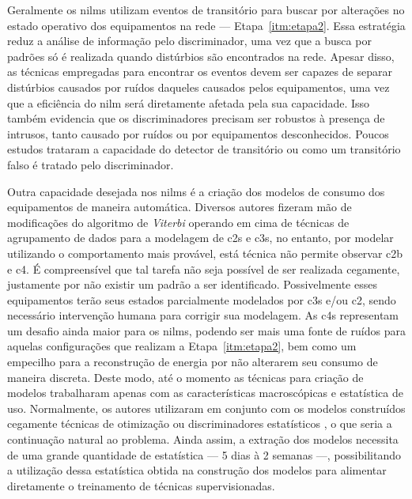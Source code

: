 Geralmente os \glspl{nilm} utilizam eventos de transitório para buscar
por alterações no estado operativo dos equipamentos na rede ---
Etapa~\ref{itm:etapa2}. Essa estratégia reduz a análise de informação
pelo discriminador, uma vez que a busca por padrões só é realizada
quando distúrbios são encontrados na rede. Apesar disso, as técnicas
empregadas para encontrar os eventos devem ser capazes de separar
distúrbios causados por ruídos daqueles causados pelos equipamentos, uma
vez que a eficiência do \gls{nilm} será diretamente afetada pela sua
capacidade. Isso também evidencia que os discriminadores precisam ser
robustos à presença de intrusos, tanto causado por ruídos ou por
equipamentos desconhecidos. Poucos estudos trataram a capacidade do
detector de transitório ou como um transitório falso é tratado pelo
discriminador.

Outra capacidade desejada nos \glspl{nilm} é a criação dos modelos
de consumo dos equipamentos de maneira automática. Diversos
autores fizeram mão de modificações do algoritmo de \emph{Viterbi}
\cite{nilm_bouloutas_viterbi_ext_1991_11,
nilm_hart_fsm_viterbi_1993_12,nilm_baranski_genetic_base_2003_19,
nilm_baranski_genetic_detalhado_2004_20,nilm_baranski_summary_2004_21,
nilm_bergman_distribuido_2011,nilm_zeifman_vast_2011,
nilm_zeifman_vastext_approach_2012,
nilm_zeifman_statistical_vastext_1stws_2012,
seminilm_fhmm_empiricalnmeter_2013}
operando em cima de técnicas de agrupamento de dados para a modelagem
de \glspl{c2} e \glspl{c3}, no entanto, por modelar utilizando o
comportamento mais provável, está técnica não permite observar
\gls{c2b} e \gls{c4}. É compreensível que tal tarefa não seja possível
de ser realizada cegamente, justamente por não existir um padrão a ser
identificado. Possivelmente esses equipamentos terão seus estados
parcialmente modelados por \glspl{c3} e/ou \gls{c2}, sendo necessário
intervenção humana para corrigir sua modelagem. As \glspl{c4}
representam um desafio ainda maior para os \glspl{nilm}, podendo ser
mais uma fonte de ruídos para aquelas configurações que realizam a
Etapa~\ref{itm:etapa2}, bem como um empecilho para a reconstrução de
energia por não alterarem seu consumo de maneira discreta. Deste modo,
até o momento as técnicas para criação de modelos trabalharam apenas
com as características macroscópicas e estatística de uso.
Normalmente, os autores utilizaram em conjunto com os modelos
construídos cegamente técnicas de otimização
\cite{nilm_bergman_distribuido_2011} ou discriminadores estatísticos
\cite{nilm_zeifman_vast_2011, nilm_zeifman_vastext_approach_2012,
nilm_zeifman_statistical_vastext_1stws_2012,
seminilm_fhmm_empiricalnmeter_2013}, o que seria a continuação natural
ao problema. Ainda assim, a extração dos modelos necessita de uma
grande quantidade de estatística --- 5 dias à 2 semanas ---,
possibilitando a utilização dessa estatística obtida na construção dos
modelos para alimentar diretamente o treinamento de técnicas
supervisionadas.

